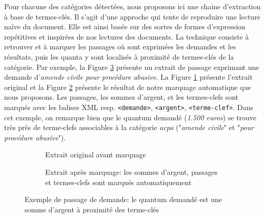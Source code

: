 Pour chacune des catégories détectées, nous proposons ici une chaine d'extraction à base de termes-clés. Il s'agit d'une approche qui tente de reproduire une lecture naïve du document. Elle est ainsi basée sur des sortes de formes d'expression repétitives et inspirées de nos lectures des documents. La technique consiste à retrouver et à marquer les passages où sont exprimées les demandes et les résultats, puis les quanta y sont localisés à proximité de termes-clés de la catégorie. Par exemple, la Figure \ref{fig:quanta:exemple-proximite} présente un extrait de passage exprimant une demande d'\textit{amende civile pour procédure abusive}. La Figure \ref{fig:quanta:exemple-proximite-original} présente l'extrait original et la Figure \ref{fig:quanta:exemple-proximite-marquage} présente le résultat de notre marquage automatique que nous proposons. Les passages, les sommes d'argent, et les termes-clefs sont marqués avec les balises XML resp. \verb=<demande>=, \verb=<argent>=, \verb=<terme-clef>=. Dans cet exemple, on remarque bien que le quantum demandé (\textit{1.500 euros}) se trouve très près de terme-clefs associables à la catégorie \textit{acpa} ("\textit{amende civile}" et "\textit{pour procédure abusive}"). 
\begin{figure}
\scriptsize
\centering
\begin{subfigure}[t]{0.95\textwidth}
\caption{Extrait original avant marquage}\label{fig:quanta:exemple-proximite-original}
\end{subfigure} 


\begin{subfigure}[t]{0.95\textwidth}
\caption{Extrait après marquage: les sommes d'argent, passages et termes-clefs sont marqués automatiquement}\label{fig:quanta:exemple-proximite-marquage}
\end{subfigure}
\caption{Exemple de passage de demande: le quantum demandé est une somme d'argent à proximité des terme-clés}
    \label{fig:quanta:exemple-proximite}
\end{figure}


